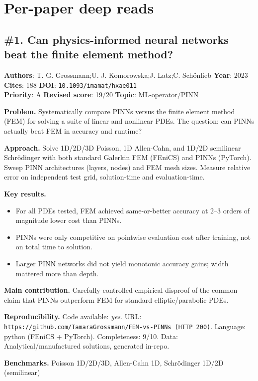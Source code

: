 \documentclass[10pt,letterpaper]{article}
\begin{document}
\newpage
\section{Per-paper deep reads}

\subsection*{\#1. Can physics-informed neural networks beat the finite element method?}
\textbf{Authors}: T. G. Grossmann;U. J. Komorowska;J. Latz;C. Schönlieb \textbullet{} \textbf{Year}: 2023 \textbullet{} \textbf{Cites}: 188 \textbullet{} \textbf{DOI}: \texttt{10.1093/imamat/hxae011} \\
\textbf{Priority}: A \textbullet{} \textbf{Revised score}: 19/20 \textbullet{} \textbf{Topic}: ML-operator/PINN

\textbf{Problem.} Systematically compare PINNs versus the finite element method (FEM) for solving a suite of linear and nonlinear PDEs. The question: can PINNs actually beat FEM in accuracy and runtime?

\textbf{Approach.} Solve 1D/2D/3D Poisson, 1D Allen-Cahn, and 1D/2D semilinear Schrödinger with both standard Galerkin FEM (FEniCS) and PINNs (PyTorch). Sweep PINN architectures (layers, nodes) and FEM mesh sizes. Measure relative error on independent test grid, solution-time and evaluation-time.

\textbf{Key results.}
\begin{itemize}
\item For all PDEs tested, FEM achieved same-or-better accuracy at 2–3 orders of magnitude lower cost than PINNs.
\item PINNs were only competitive on pointwise evaluation cost after training, not on total time to solution.
\item Larger PINN networks did not yield monotonic accuracy gains; width mattered more than depth.
\end{itemize}

\textbf{Main contribution.} Carefully-controlled empirical disproof of the common claim that PINNs outperform FEM for standard elliptic/parabolic PDEs.

\textbf{Reproducibility.} Code available: \emph{yes}. URL: \texttt{https://github.com/TamaraGrossmann/FEM-vs-PINNs (HTTP 200)}. Language: python (FEniCS + PyTorch). Completeness: 9/10. Data: Analytical/manufactured solutions, generated in-repo.

\textbf{Benchmarks.} Poisson 1D/2D/3D, Allen-Cahn 1D, Schrödinger 1D/2D (semilinear)
\end{document}
